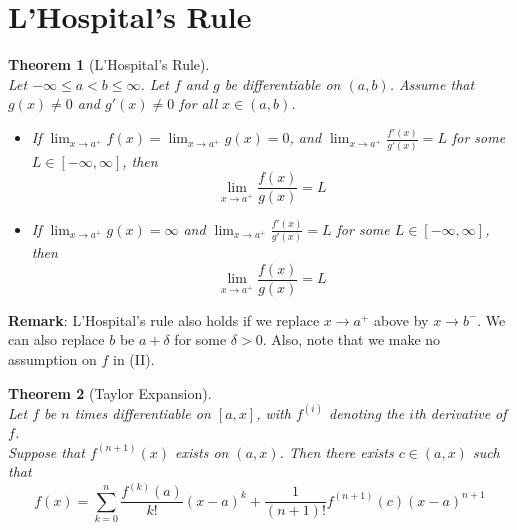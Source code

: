 \documentclass[12pt]{article}
\newtheorem{theorem}{Theorem}[section]
\theoremstyle{definition}
\begin{document}
\section{L'Hospital's Rule}
\begin{theorem}[L'Hospital's Rule]
\hfill\\\normalfont Let $-\infty\leq a<b\leq \infty$. Let $f$ and $g$ be differentiable on $(a,b)$. Assume that $g(x)\neq 0$ and $g'(x)\neq 0$ for all $x\in(a,b)$.\\
\begin{itemize}
	\item[(I)] If $\lim_{x\to a^{+}} f(x)=\lim_{x\to a^{+}} g(x)=0$, and $\lim_{x\to a^{+}} \frac{f'(x)}{g'(x)}=L$ for some $L\in[-\infty,\infty]$, then
	\[
\lim_{x\to a^{+}} \frac{f(x)}{g(x)}=L
	\]
	\item[(II)] If $\lim_{x\to a^{+}} g(x)=\infty$ and $\lim_{x\to a^{+}} \frac{f'(x)}{g'(x)}=L$ for some $L\in[-\infty, \infty]$, then
	\[
\lim_{x\to a^{+}} \frac{f(x)}{g(x)}=L
	\]
\end{itemize}
\end{theorem}
\textbf{Remark}: L'Hospital's rule also holds if we replace $x\to a^{+}$ above by $x\to b^{-}$. We can also replace $b$ be $a+\delta$ for some $\delta>0$. Also, note that we make no assumption on $f$ in (II).
\begin{theorem}[Taylor Expansion]
\hfill\\\normalfont Let $f$ be $n$ times differentiable on $[a,x]$, with $f^{(i)}$ denoting the $i$th derivative of $f$.\\
Suppose that $f^{(n+1)}(x)$ exists on $(a,x)$. Then there exists $c\in(a,x)$ such that
\[
f(x)=\sum_{k=0}^n \frac{f^{(k)}(a)}{k!}(x-a)^k +\frac{1}{(n+1)!} f^{(n+1)}(c)(x-a)^{n+1}
\]
\end{theorem}
\clearpage
\end{document}

